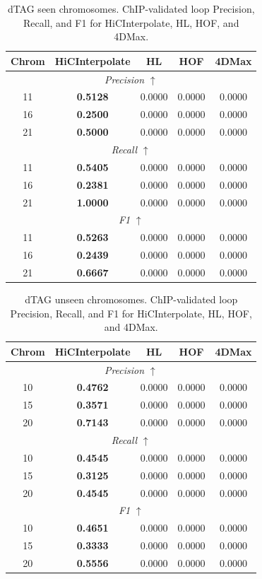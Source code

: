 \begin{table}[!htbp]
\centering
\caption{dTAG seen chromosomes. ChIP-validated loop Precision, Recall, and F1 for HiCInterpolate, HL, HOF, and 4DMax.}
\label{tab:seen_dtag_chip_loops}
\begin{tabular}{|c|c|c|c|c|}
\hline
Chrom & HiCInterpolate & HL & HOF & 4DMax \\
\hline
\multicolumn{5}{|c|}{\textit{Precision} $\uparrow$} \\
\hline
11 & \textbf{0.5128} & 0.0000 & 0.0000 & 0.0000 \\
16 & \textbf{0.2500} & 0.0000 & 0.0000 & 0.0000 \\
21 & \textbf{0.5000} & 0.0000 & 0.0000 & 0.0000 \\
\hline
\multicolumn{5}{|c|}{\textit{Recall} $\uparrow$} \\
\hline
11 & \textbf{0.5405} & 0.0000 & 0.0000 & 0.0000 \\
16 & \textbf{0.2381} & 0.0000 & 0.0000 & 0.0000 \\
21 & \textbf{1.0000} & 0.0000 & 0.0000 & 0.0000 \\
\hline
\multicolumn{5}{|c|}{\textit{F1} $\uparrow$} \\
\hline
11 & \textbf{0.5263} & 0.0000 & 0.0000 & 0.0000 \\
16 & \textbf{0.2439} & 0.0000 & 0.0000 & 0.0000 \\
21 & \textbf{0.6667} & 0.0000 & 0.0000 & 0.0000 \\
\hline
\end{tabular}
\end{table}

\begin{table}[!htbp]
\centering
\caption{dTAG unseen chromosomes. ChIP-validated loop Precision, Recall, and F1 for HiCInterpolate, HL, HOF, and 4DMax.}
\label{tab:unseen_dtag_chip_loops}
\begin{tabular}{|c|c|c|c|c|}
\hline
Chrom & HiCInterpolate & HL & HOF & 4DMax \\
\hline
\multicolumn{5}{|c|}{\textit{Precision} $\uparrow$} \\
\hline
10 & \textbf{0.4762} & 0.0000 & 0.0000 & 0.0000 \\
15 & \textbf{0.3571} & 0.0000 & 0.0000 & 0.0000 \\
20 & \textbf{0.7143} & 0.0000 & 0.0000 & 0.0000 \\
\hline
\multicolumn{5}{|c|}{\textit{Recall} $\uparrow$} \\
\hline
10 & \textbf{0.4545} & 0.0000 & 0.0000 & 0.0000 \\
15 & \textbf{0.3125} & 0.0000 & 0.0000 & 0.0000 \\
20 & \textbf{0.4545} & 0.0000 & 0.0000 & 0.0000 \\
\hline
\multicolumn{5}{|c|}{\textit{F1} $\uparrow$} \\
\hline
10 & \textbf{0.4651} & 0.0000 & 0.0000 & 0.0000 \\
15 & \textbf{0.3333} & 0.0000 & 0.0000 & 0.0000 \\
20 & \textbf{0.5556} & 0.0000 & 0.0000 & 0.0000 \\
\hline
\end{tabular}
\end{table}


